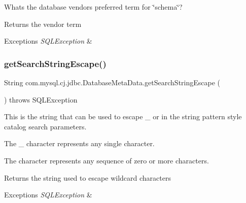 What\textquotesingle{}s the database vendor\textquotesingle{}s preferred term for \char`\"{}schema\char`\"{}?

\begin{DoxyReturn}{Returns}
the vendor term 
\end{DoxyReturn}

\begin{DoxyExceptions}{Exceptions}
{\em S\+Q\+L\+Exception} & \\
\hline
\end{DoxyExceptions}
\mbox{\label{classcom_1_1mysql_1_1cj_1_1jdbc_1_1_database_meta_data_ae340a42fa7071bbc701cb74bec470c7b}} 
\subsubsection{\texorpdfstring{get\+Search\+String\+Escape()}{getSearchStringEscape()}}
{\footnotesize\ttfamily String com.\+mysql.\+cj.\+jdbc.\+Database\+Meta\+Data.\+get\+Search\+String\+Escape (\begin{DoxyParamCaption}{ }\end{DoxyParamCaption}) throws S\+Q\+L\+Exception}

This is the string that can be used to escape \textquotesingle{}\+\_\+\textquotesingle{} or \textquotesingle{}\textquotesingle{} in the string pattern style catalog search parameters. 

The \textquotesingle{}\+\_\+\textquotesingle{} character represents any single character. 

The \textquotesingle{}\textquotesingle{} character represents any sequence of zero or more characters. 

\begin{DoxyReturn}{Returns}
the string used to escape wildcard characters 
\end{DoxyReturn}

\begin{DoxyExceptions}{Exceptions}
{\em S\+Q\+L\+Exception} & \\
\hline
\end{DoxyExceptions}
\mbox{\label{classcom_1_1mysql_1_1cj_1_1jdbc_1_1_database_meta_data_aab2c54d10e91a54ade1420ba242372fd}} 

